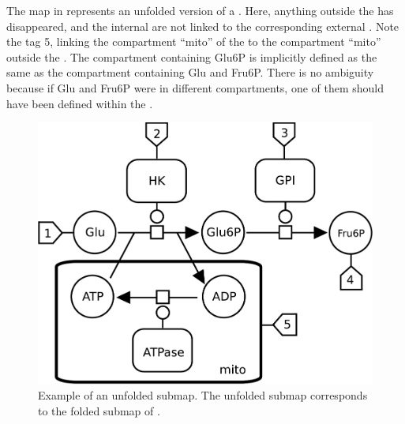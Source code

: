 The map in  represents an unfolded version of a .  Here, anything outside the  has disappeared, and the internal  are not linked to the corresponding external .  Note the tag 5, linking the compartment ``mito'' of the  to the compartment ``mito'' outside the .  The compartment containing Glu6P is implicitly defined as the same as the compartment containing Glu and Fru6P.  There is no ambiguity because if Glu and Fru6P were in different compartments, one of them should have been defined within the .

\begin{figure}[H]
  \centering
  \includegraphics[scale = 0.35]{examples/submap-dissociated}
  \caption{Example of an unfolded submap. The unfolded submap corresponds to the folded submap of .}
  \label{fig:submap-unfolded}
\end{figure}







